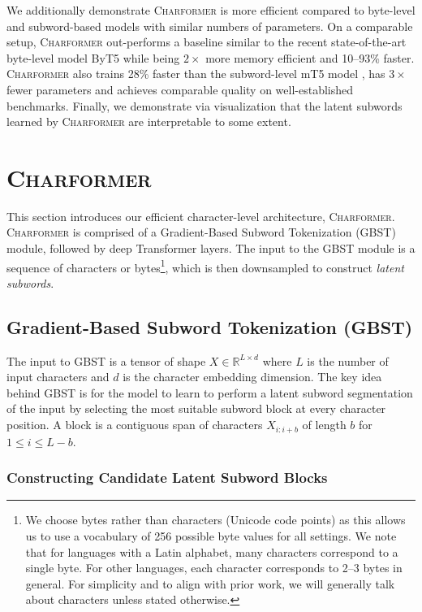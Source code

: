 \documentclass{article} \usepackage{iclr2022_conference,times}
\newcommand{\charformer}{\textsc{Charformer}\xspace}
\begin{document}
We additionally demonstrate \charformer is more efficient compared to byte-level and subword-based models with similar numbers of parameters. On a comparable setup, \charformer out-performs a baseline similar to the recent state-of-the-art byte-level model ByT5 \citep{Xue2021byt5} while being $2\times$ more memory efficient and 10--93\% faster. \charformer also trains 28\% faster than the subword-level mT5 model \citep{xue2020mt5}, has $3\times$ fewer parameters and achieves comparable quality on well-established benchmarks. Finally, we demonstrate via visualization that the latent subwords learned by \charformer are interpretable to some extent.

\section{\charformer}

This section introduces our efficient character-level architecture, \charformer. \charformer is comprised of a Gradient-Based Subword Tokenization (GBST) module, followed by deep Transformer layers. The input to the GBST module is a sequence of characters or bytes\footnote{We choose bytes rather than characters (Unicode code points) as this allows us to use a vocabulary of 256 possible byte values for all settings. We note that for languages with a Latin alphabet, many characters correspond to a single byte. For other languages, each character corresponds to 2--3 bytes in general. For simplicity and to align with prior work, we will generally talk about characters unless stated otherwise.}, which is then downsampled to construct \emph{latent subwords}.  

\subsection{Gradient-Based Subword Tokenization (GBST)}
The input to GBST is a tensor of shape $X \in \mathbb{R}^{L \times d}$ where $L$ is the number of input characters and $d$ is the character embedding dimension. The key idea behind GBST is for the model to learn to perform a latent subword segmentation of the input by selecting the most suitable subword block at every character position. A block is a contiguous span of characters $X_{i:i+b}$ of length $b$ for $ 1 \leq i \leq L-b$.


\subsubsection{Constructing Candidate Latent Subword Blocks}  \label{sec:constructing_subword_blocks}
\end{document}
